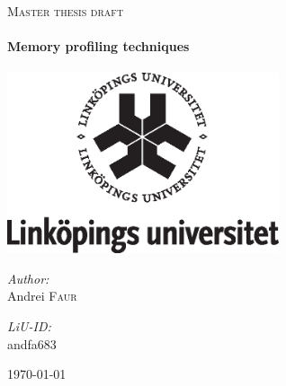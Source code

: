 \begin{titlepage}

\begin{center}

\textsc{\LARGE Master thesis draft}\\[1.5cm]

\HRule \\[0.4cm]	
{ \huge \bfseries Memory profiling techniques}\\[0.4cm]
\HRule \\[1.5cm]

\includegraphics[width=0.6\textwidth]{src/img/LinkUniv_staende}

\vspace*{1cm}

\begin{minipage}{0.4\textwidth}
\begin{flushleft} \large
\emph{Author:}\\
Andrei \textsc{Faur}\\
\end{flushleft}
\end{minipage}
\begin{minipage}{0.4\textwidth}
\begin{flushright} \large
\emph{LiU-ID:}\\
andfa683\\
\end{flushright}
\end{minipage}

\vfill

{\large \today}

\end{center}

\end{titlepage}
